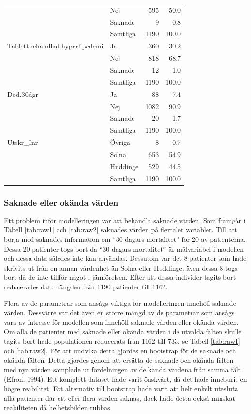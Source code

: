 \begin{table}[htbp]
{\begin{tabular}{ll|rr}
   & Nej & 595 & 50.0 \\ 
   & Saknade & 9 & 0.8 \\ 
   \hline
 & Samtliga & 1190 & 100.0 \\ 
   \hline
\hline
Tablettbehandlad.hyperlipedemi & Ja & 360 & 30.2 \\ 
   & Nej & 818 & 68.7 \\ 
   & Saknade & 12 & 1.0 \\ 
   \hline
 & Samtliga & 1190 & 100.0 \\ 
   \hline
\hline
Död.30dgr & Ja & 88 & 7.4 \\ 
   & Nej & 1082 & 90.9 \\ 
   & Saknade & 20 & 1.7 \\ 
   \hline
 & Samtliga & 1190 & 100.0 \\ 
   \hline
\hline
Utskr\_Inr & Övriga & 8 & 0.7 \\ 
   & Solna & 653 & 54.9 \\ 
   & Huddinge & 529 & 44.5 \\ 
   \hline
 & Samtliga & 1190 & 100.0 \\ 
   \hline
\hline
\end{tabular}
}

\end{table}


\subsubsection{Saknade eller okända värden}
Ett problem inför modelleringen var att behandla saknade värden. Som framgår i Tabell \ref{tab:raw1} och \ref{tab:raw2} saknades värden på flertalet variabler. Till att börja med saknades information om “30 dagars mortalitet” för 20 av patienterna. Dessa 20 patienter togs bort då “30 dagars mortalitet” är målvariabel i modellen och dessa data således inte kan användas. Dessutom var det 8 patienter som hade skrivits ut från en annan vårdenhet än Solna eller Huddinge, även dessa 8 togs bort då de inte tillför något i jämförelsen. Efter att dessa individer  tagits bort reducerades datamängden från 1190 patienter till 1162.

Flera av de parametrar som ansågs viktiga för modelleringen innehöll  saknade värden. Dessvärre var det även en större mängd av de parametrar som ansågs vara av intresse för modellen som innehöll saknade värden eller okända värden. Om alla de patienter med saknade eller okända värden i de utvalda fälten skulle tagits bort hade populationen reducerats från 1162 till 733, se Tabell \ref{tab:raw1} och \ref{tab:raw2}. För att undvika detta gjordes en bootstrap för de saknade och okända fälten. Detta gjordes genom att ersätta de saknade och okända fälten med nya värden samplade ur fördelningen av de kända värdena från samma fält (Efron, 1994). Ett komplett dataset hade varit önskvärt, då det hade inneburit en högre reabilitet. Ett alternativ till bootstrap hade varit att helt enkelt utesluta alla patienter där ett eller flera värden saknas, dock hade detta också minskat reabiliteten då helhetsbilden rubbas. 

